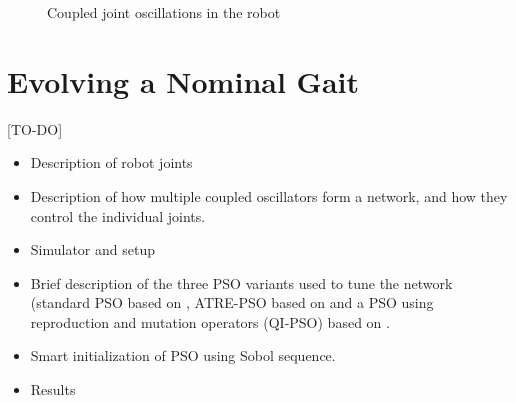 \documentclass[12pt,twoside]{article}
\theoremstyle{plain}
\theoremstyle{definition}
\theoremstyle{remark}
\begin{document}
\begin{figure}[H]
\centering     %
{}
\caption{Coupled joint oscillations in the robot}
\label{fig:nao_joint_motion}
\end{figure}


\section{Evolving a Nominal Gait}
\label{sec:Evolving_a_Nominal_Gait}
[TO-DO]
\begin{itemize}
\item Description of robot joints
\item Description of how multiple coupled oscillators form a network, and how they control the individual joints. 
\item Simulator and setup
\item Brief description of the three PSO variants used to tune the network (standard PSO based on \cite{Eberhart1995, Shi1998, Kennedy2002}, ATRE-PSO based on \cite{Pant2007a} and a PSO using reproduction and mutation operators (QI-PSO) based on \cite{Pant2007}.
\item Smart initialization of PSO using Sobol sequence.
\item Results
\end{itemize}
\end{document}
